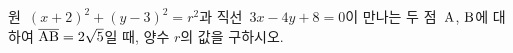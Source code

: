 원~$(x+2)^2+(y-3)^2=r^2$과 직선~$3x-4y+8=0$이 만나는 두 점~$\mathrm{A}$, $\mathrm{B}$에 대하여 $\overline{\mathrm{AB}}=2\sqrt{5}$일 때, 양수 $r$의 값을 구하시오.
